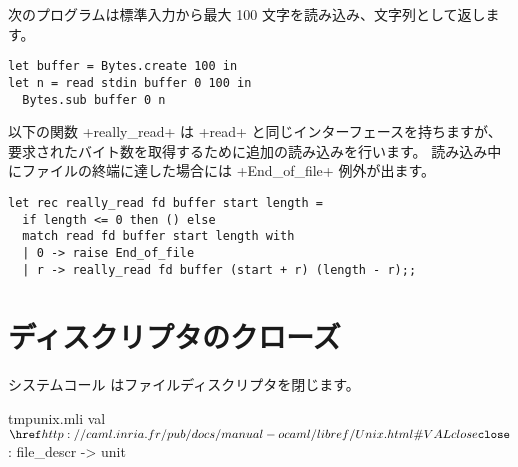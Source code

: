 \begin{example}
次のプログラムは標準入力から最大 100 文字を読み込み、文字列として返します。
%
\begin{lstlisting}
let buffer = Bytes.create 100 in
let n = read stdin buffer 0 100 in
  Bytes.sub buffer 0 n
\end{lstlisting}
\end{example}

\begin{example}
以下の関数 \ml+really_read+ は \ml+read+ と同じインターフェースを持ちますが、
要求されたバイト数を取得するために追加の読み込みを行います。
読み込み中にファイルの終端に達した場合には \ml+End_of_file+ 例外が出ます。
%
\begin{lstlisting}
let rec really_read fd buffer start length =
  if length <= 0 then () else
  match read fd buffer start length with
  | 0 -> raise End_of_file
  | r -> really_read fd buffer (start + r) (length - r);;
\end{lstlisting}
%
\end{example}

\section{ディスクリプタのクローズ}

システムコール  はファイルディスクリプタを閉じます。
%
\begin{listingcodefile}{tmpunix.mli}
val $\libvalue{Unix}{close}$ : file_descr -> unit
\end{listingcodefile}
%

